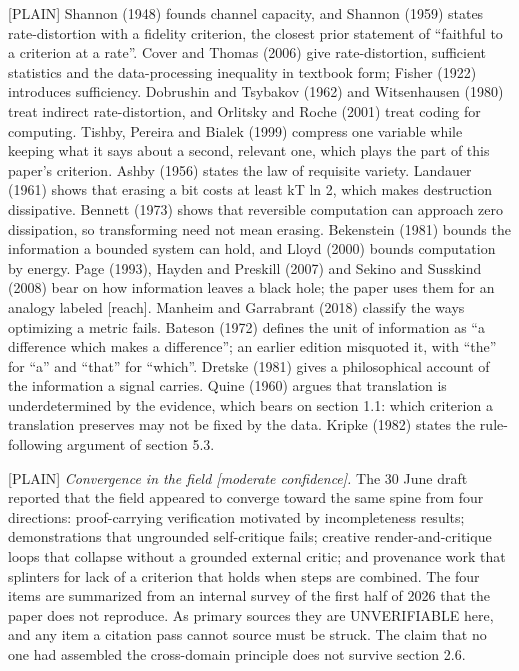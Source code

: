 \documentclass[11pt]{article}
\newcommand{\register}[1]{{\ttfamily\small #1}}
\begin{document}
\register{[PLAIN]} Shannon (1948) founds channel capacity, and Shannon (1959) states rate-distortion with a fidelity criterion, the closest prior statement of ``faithful to a criterion at a rate''. Cover and Thomas (2006) give rate-distortion, sufficient statistics and the data-processing inequality in textbook form; Fisher (1922) introduces sufficiency. Dobrushin and Tsybakov (1962) and Witsenhausen (1980) treat indirect rate-distortion, and Orlitsky and Roche (2001) treat coding for computing. Tishby, Pereira and Bialek (1999) compress one variable while keeping what it says about a second, relevant one, which plays the part of this paper's criterion. Ashby (1956) states the law of requisite variety. Landauer (1961) shows that erasing a bit costs at least kT ln 2, which makes destruction dissipative. Bennett (1973) shows that reversible computation can approach zero dissipation, so transforming need not mean erasing. Bekenstein (1981) bounds the information a bounded system can hold, and Lloyd (2000) bounds computation by energy. Page (1993), Hayden and Preskill (2007) and Sekino and Susskind (2008) bear on how information leaves a black hole; the paper uses them for an analogy labeled [reach]. Manheim and Garrabrant (2018) classify the ways optimizing a metric fails. Bateson (1972) defines the unit of information as ``a difference which makes a difference''; an earlier edition misquoted it, with ``the'' for ``a'' and ``that'' for ``which''. Dretske (1981) gives a philosophical account of the information a signal carries. Quine (1960) argues that translation is underdetermined by the evidence, which bears on section 1.1: which criterion a translation preserves may not be fixed by the data. Kripke (1982) states the rule-following argument of section 5.3.

\register{[PLAIN]} \emph{Convergence in the field [moderate confidence].} The 30 June draft reported that the field appeared to converge toward the same spine from four directions: proof-carrying verification motivated by incompleteness results; demonstrations that ungrounded self-critique fails; creative render-and-critique loops that collapse without a grounded external critic; and provenance work that splinters for lack of a criterion that holds when steps are combined. The four items are summarized from an internal survey of the first half of 2026 that the paper does not reproduce. As primary sources they are UNVERIFIABLE here, and any item a citation pass cannot source must be struck. The claim that no one had assembled the cross-domain principle does not survive section 2.6.
\end{document}
